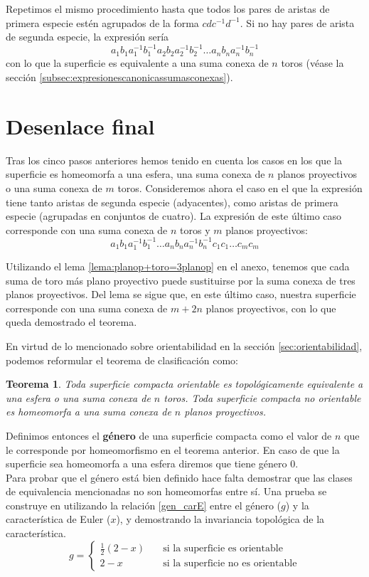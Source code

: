 \documentclass[a4paper,11pt,spanish, twoside, leqno]{tfg-uam}
\newtheorem*{teorsin}{Teorema}
\theoremstyle{definition}
\begin{document}
Repetimos el mismo procedimiento hasta que todos los pares de aristas de primera especie estén agrupados de la forma  $cdc^{-1}d^{-1}$. Si no hay pares de arista de segunda especie, la expresión sería 
\[a_1 b_1 a_1^{-1} b_1^{-1} a_2 b_2 a_2^{-1} b_2^{-1} \ldots a_n b_n a_n^{-1} b_n^{-1}\]
con lo que la superficie es equivalente a una suma conexa de $n$ toros (véase la sección \ref{subsec:expresionescanonicassumasconexas}).


\section{Desenlace final}

Tras los cinco pasos anteriores hemos tenido en cuenta los casos en los que la superficie es homeomorfa a una esfera, una suma conexa de $n$ planos proyectivos o una suma conexa de $m$ toros. Consideremos ahora el caso en el que la expresión tiene tanto aristas de segunda especie (adyacentes), como aristas de primera especie (agrupadas en conjuntos de cuatro). La expresión de este último caso corresponde con una suma conexa de $n$ toros y $m$ planos proyectivos:
\[ a_1 b_1 a_1^{-1} b_1^{-1} \ldots a_n b_n a_n^{-1} b_n^{-1} c_1 c_1 \ldots c_m c_m \] 

Utilizando el lema \ref{lema:planop+toro=3planop} en el anexo, tenemos que cada suma de toro más plano proyectivo puede sustituirse por la suma conexa de tres planos proyectivos. Del lema se sigue que, en este último caso, nuestra superficie corresponde con una suma conexa de $m+2n$ planos proyectivos, con lo que queda demostrado el teorema.

En virtud de lo mencionado sobre orientabilidad en la sección \ref{sec:orientabilidad}, podemos reformular el teorema de clasificación como:

\begin{teorsin}
Toda superficie compacta orientable es topológicamente equivalente a una esfera o una suma conexa de $n$ toros. Toda superficie compacta no orientable es homeomorfa a una suma conexa de $n$ planos proyectivos.
\end{teorsin}

Definimos entonces el \textbf{género} de una superficie compacta como el valor de $n$ que le corresponde por homeomorfismo en el teorema anterior. En caso de que la superficie sea homeomorfa a una esfera diremos que tiene género 0. \\
Para probar que el género está bien definido hace falta demostrar que las clases de equivalencia mencionadas no son homeomorfas entre sí. Una prueba se construye en \cite{massey} utilizando la relación \ref{gen_carE} entre el género ($g$) y la característica de Euler ($x$), y demostrando la invariancia topológica de la característica.
\begin{equation}
\label{gen_carE}
g = \begin{cases}
\frac{1}{2}(2-x) & \quad \text{si la superficie es orientable}\\
2-x & \quad \text{si la superficie no es orientable}
\end{cases}
\end{equation}
\end{document}
